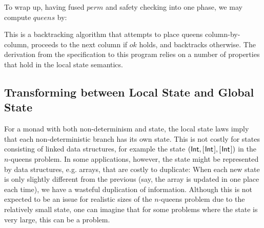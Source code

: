 \documentclass{jfp}
\newcommand{\Conid}[1]{\mathit{#1}}
\newcommand{\Varid}[1]{\mathit{#1}}
\def\resethooks{%
  \global\let\SaveRestoreHook\empty
  \global\let\ColumnHook\empty}
\let\hspre\empty
\let\hspost\empty
\let\Varid\mathit
\let\Conid\mathsf
\begin{document}
To wrap up, having fused \ensuremath{\Varid{perm}} and safety checking into one phase, we may compute \ensuremath{\Varid{queens}} by:
\resethooks
This is a backtracking algorithm that attempts to place queens column-by-column, proceeds to the next column if \ensuremath{\Varid{ok}} holds, and backtracks otherwise.
The derivation from the specification to this program relies on a number of properties that hold in the local state semantics.

\subsection{Transforming between Local State and Global State}
\label{sec:space-usage}
For a monad with both non-determinism and state, the local state laws imply that
each non-deterministic branch has its own state. This is not costly for states
consisting of linked data structures, for example the state
\ensuremath{(\Conid{Int},[\mskip1.5mu \Conid{Int}\mskip1.5mu],[\mskip1.5mu \Conid{Int}\mskip1.5mu])}
in the \ensuremath{\Varid{n}}-queens problem. In some applications, however, the state
might be represented by data structures, e.g. arrays, that are costly to
duplicate: 
When each new state is only slightly different from the previous
(say, the array is updated in one place each time), we have a wasteful
duplication of information.
Although this is not expected to be an issue for realistic sizes of the
\ensuremath{\Varid{n}}-queens problem due to the relatively small state, one can imagine that for
some problems where the state is very large, this can be a problem.
\end{document}
